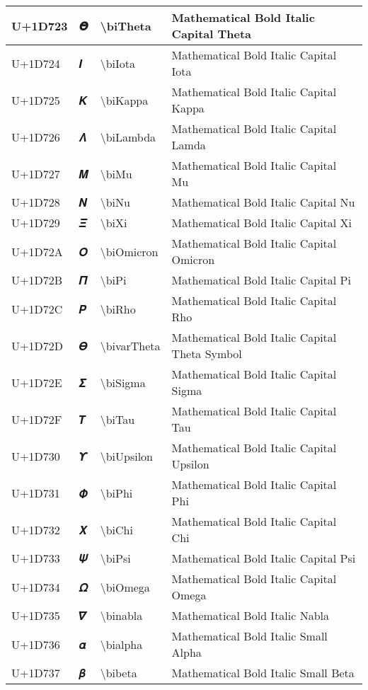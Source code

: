 \begin{table}[h]
\begin{tabulary}{\linewidth}{|L|L|L|L|}
\hline
U+1D723 & 𝜣 & {\textbackslash}biTheta & Mathematical Bold Italic Capital Theta \\
\hline
U+1D724 & 𝜤 & {\textbackslash}biIota & Mathematical Bold Italic Capital Iota \\
\hline
U+1D725 & 𝜥 & {\textbackslash}biKappa & Mathematical Bold Italic Capital Kappa \\
\hline
U+1D726 & 𝜦 & {\textbackslash}biLambda & Mathematical Bold Italic Capital Lamda \\
\hline
U+1D727 & 𝜧 & {\textbackslash}biMu & Mathematical Bold Italic Capital Mu \\
\hline
U+1D728 & 𝜨 & {\textbackslash}biNu & Mathematical Bold Italic Capital Nu \\
\hline
U+1D729 & 𝜩 & {\textbackslash}biXi & Mathematical Bold Italic Capital Xi \\
\hline
U+1D72A & 𝜪 & {\textbackslash}biOmicron & Mathematical Bold Italic Capital Omicron \\
\hline
U+1D72B & 𝜫 & {\textbackslash}biPi & Mathematical Bold Italic Capital Pi \\
\hline
U+1D72C & 𝜬 & {\textbackslash}biRho & Mathematical Bold Italic Capital Rho \\
\hline
U+1D72D & 𝜭 & {\textbackslash}bivarTheta & Mathematical Bold Italic Capital Theta Symbol \\
\hline
U+1D72E & 𝜮 & {\textbackslash}biSigma & Mathematical Bold Italic Capital Sigma \\
\hline
U+1D72F & 𝜯 & {\textbackslash}biTau & Mathematical Bold Italic Capital Tau \\
\hline
U+1D730 & 𝜰 & {\textbackslash}biUpsilon & Mathematical Bold Italic Capital Upsilon \\
\hline
U+1D731 & 𝜱 & {\textbackslash}biPhi & Mathematical Bold Italic Capital Phi \\
\hline
U+1D732 & 𝜲 & {\textbackslash}biChi & Mathematical Bold Italic Capital Chi \\
\hline
U+1D733 & 𝜳 & {\textbackslash}biPsi & Mathematical Bold Italic Capital Psi \\
\hline
U+1D734 & 𝜴 & {\textbackslash}biOmega & Mathematical Bold Italic Capital Omega \\
\hline
U+1D735 & 𝜵 & {\textbackslash}binabla & Mathematical Bold Italic Nabla \\
\hline
U+1D736 & 𝜶 & {\textbackslash}bialpha & Mathematical Bold Italic Small Alpha \\
\hline
U+1D737 & 𝜷 & {\textbackslash}bibeta & Mathematical Bold Italic Small Beta \\

\end{tabulary}
\end{table}
